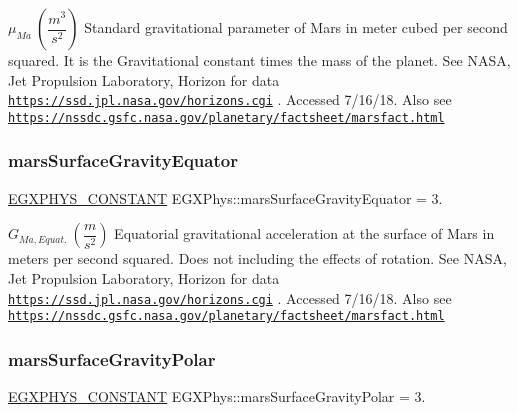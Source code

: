 $ \mu_{Ma} \ (\dfrac{m^3}{s^2})$ Standard gravitational parameter of Mars in meter cubed per second squared. It is the Gravitational constant times the mass of the planet. See N\+A\+SA, Jet Propulsion Laboratory, Horizon for data \href{https://ssd.jpl.nasa.gov/horizons.cgi}{\tt https\+://ssd.\+jpl.\+nasa.\+gov/horizons.\+cgi} . Accessed 7/16/18. Also see \href{https://nssdc.gsfc.nasa.gov/planetary/factsheet/marsfact.html}{\tt https\+://nssdc.\+gsfc.\+nasa.\+gov/planetary/factsheet/marsfact.\+html} \mbox{\label{group___e_g_x_phys-_constants-_astrophysics-_solar_system-_mars-_bulk_gab539556e60edb738ad95331ce681eb23}} 
\subsubsection{\texorpdfstring{mars\+Surface\+Gravity\+Equator}{marsSurfaceGravityEquator}}
{\footnotesize\ttfamily \mbox{\hyperlink{group___e_g_x_phys-_constants-_macros_ga76980d288494ce1714c9ac68a95ba702}{E\+G\+X\+P\+H\+Y\+S\+\_\+\+C\+O\+N\+S\+T\+A\+NT}} E\+G\+X\+Phys\+::mars\+Surface\+Gravity\+Equator = 3.}

$ G_{Ma,Equat.} \ (\dfrac{m}{s^2})$ Equatorial gravitational acceleration at the surface of Mars in meters per second squared. Does not including the effects of rotation. See N\+A\+SA, Jet Propulsion Laboratory, Horizon for data \href{https://ssd.jpl.nasa.gov/horizons.cgi}{\tt https\+://ssd.\+jpl.\+nasa.\+gov/horizons.\+cgi} . Accessed 7/16/18. Also see \href{https://nssdc.gsfc.nasa.gov/planetary/factsheet/marsfact.html}{\tt https\+://nssdc.\+gsfc.\+nasa.\+gov/planetary/factsheet/marsfact.\+html} \mbox{\label{group___e_g_x_phys-_constants-_astrophysics-_solar_system-_mars-_bulk_ga36597d59fa02325d03d8703d402cbb1f}} 
\subsubsection{\texorpdfstring{mars\+Surface\+Gravity\+Polar}{marsSurfaceGravityPolar}}
{\footnotesize\ttfamily \mbox{\hyperlink{group___e_g_x_phys-_constants-_macros_ga76980d288494ce1714c9ac68a95ba702}{E\+G\+X\+P\+H\+Y\+S\+\_\+\+C\+O\+N\+S\+T\+A\+NT}} E\+G\+X\+Phys\+::mars\+Surface\+Gravity\+Polar = 3.}

